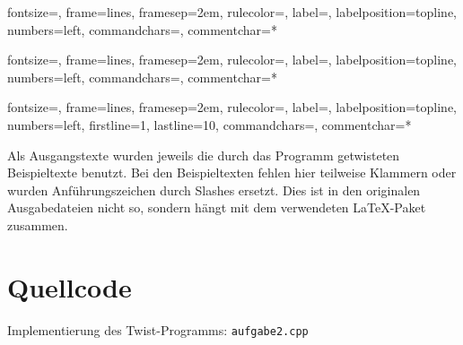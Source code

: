 \documentclass[a4paper, notitlepage, 12pt]{scrartcl}
\newenvironment{longlisting}{\captionsetup{type=listing}}{}
\begin{document}
%
{fontsize=\footnotesize,
	frame=lines,  %
	framesep=2em, %
	rulecolor=\color{Gray},
	label=,
	labelposition=topline,
	numbers=left,
	commandchars=\|\(\), %
	commentchar=*        %
}
\begingroup
{}
\endgroup

%
{fontsize=\footnotesize,
	frame=lines,  %
	framesep=2em, %
	rulecolor=\color{Gray},
	label=,
	labelposition=topline,
	numbers=left,
	commandchars=\|\(\), %
	commentchar=*        %
}
\begingroup
{}
\endgroup

%
{fontsize=\footnotesize,
	frame=lines,  %
	framesep=2em, %
	rulecolor=\color{Gray},
	label=,
	labelposition=topline,
	numbers=left,
	firstline=1,
	lastline=10,
	commandchars=\|\(\), %
	commentchar=*        %
}
\begingroup
{}
\endgroup

Als Ausgangstexte wurden jeweils die durch das Programm getwisteten Beispieltexte benutzt.
Bei den Beispieltexten fehlen hier teilweise Klammern oder wurden Anführungszeichen durch Slashes ersetzt. Dies ist in den originalen Ausgabedateien nicht so, sondern hängt mit dem verwendeten \LaTeX{}-Paket zusammen.

\section{Quellcode}
 \renewcommand{\listingscaption}{Quellcode}

 \begin{longlisting}
 \caption{Implementierung des Twist-Programms: \texttt{aufgabe2.cpp}}
 \end{longlisting}

 
\end{document}

